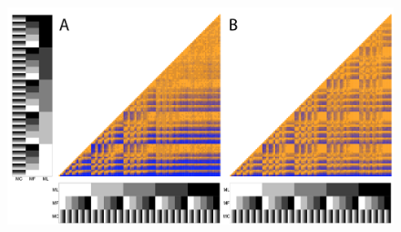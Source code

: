 \documentclass[12pt,letterpaper]{article}
\begin{document}
\newpage
\begin{figure}
\centering
    \includegraphics[width=1\textwidth]{MainBody-LaTeXSuppFiles/Figures/In_main/PairwiseComp-Baycon-RF+Tr-colour.png} %
\caption{ }
\end{figure} %
\end{document}
